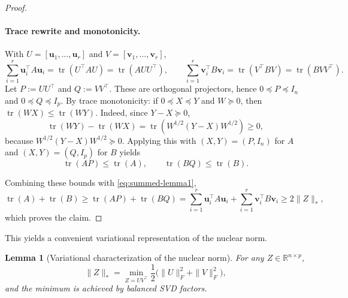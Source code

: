\documentclass[11pt]{article}
\theoremstyle{spaced}
\newtheorem{lemma}{Lemma}
\begin{document}
\begin{proof}
\paragraph{Trace rewrite and monotonicity.}
With \(U = [\mathbf{u}_1,\dots,\mathbf{u}_r]\) and \(V = [\mathbf{v}_1,\dots,\mathbf{v}_r]\),
\[
\sum_{i=1}^r \mathbf{u}_i^\top A \mathbf{u}_i = \operatorname{tr}(U^\top A U) = \operatorname{tr}(A U U^\top),\qquad
\sum_{i=1}^r \mathbf{v}_i^\top B \mathbf{v}_i = \operatorname{tr}(V^\top B V) = \operatorname{tr}(B V V^\top).
\]
Let \(P := UU^\top\) and \(Q := VV^\top\). These are orthogonal projectors, hence \(0 \preceq P \preceq I_n\) and \(0 \preceq Q \preceq I_p\).
By trace monotonicity: if \(0 \preceq X \preceq Y\) and \(W \succeq 0\), then
\(\operatorname{tr}(WX) \le \operatorname{tr}(WY)\).
Indeed, since \(Y - X \succeq 0\),
\[
\operatorname{tr}(WY) - \operatorname{tr}(WX)
= \operatorname{tr}(W^{1/2}(Y-X)W^{1/2}) \ge 0,
\]
because \(W^{1/2}(Y-X)W^{1/2} \succeq 0\).
Applying this with \((X,Y) = (P,I_n)\) for \(A\) and \((X,Y) = (Q,I_p)\) for \(B\) yields
\[
\operatorname{tr}(A P) \le \operatorname{tr}(A), \qquad
\operatorname{tr}(B Q) \le \operatorname{tr}(B).
\]

Combining these bounds with \eqref{eq:summed-lemma1},
\[
\operatorname{tr}(A) + \operatorname{tr}(B)
\ge \operatorname{tr}(A P) + \operatorname{tr}(B Q)
= \sum_{i=1}^r \mathbf{u}_i^\top A \mathbf{u}_i + \sum_{i=1}^r \mathbf{v}_i^\top B \mathbf{v}_i
\ge 2\|Z\|_*,
\]
which proves the claim.
\end{proof}

This yields a convenient variational representation of the nuclear norm.

\begin{lemma}[Variational characterization of the nuclear norm]
For any \(Z \in \mathbb{R}^{n\times p}\),
\[
\|Z\|_* = \min_{Z = UV^\top} \frac{1}{2}\big(\|U\|_F^2 + \|V\|_F^2\big),
\]
and the minimum is achieved by balanced SVD factors.
\end{lemma}
\end{document}

